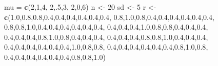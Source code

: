 \documentclass[]{book}
\newenvironment{Shaded}{\begin{snugshade}}{\end{snugshade}}
\newcommand{\DecValTok}[1]{\textcolor[rgb]{0.00,0.00,0.81}{#1}}
\newcommand{\FloatTok}[1]{\textcolor[rgb]{0.00,0.00,0.81}{#1}}
\newcommand{\KeywordTok}[1]{\textcolor[rgb]{0.13,0.29,0.53}{\textbf{#1}}}
\newcommand{\NormalTok}[1]{#1}
\newcommand{\StringTok}[1]{\textcolor[rgb]{0.31,0.60,0.02}{#1}}
\begin{document}
\begin{Shaded}
\begin{Highlighting}[]
\NormalTok{mu =}\StringTok{ }\KeywordTok{c}\NormalTok{(}\DecValTok{2}\NormalTok{,}\DecValTok{1}\NormalTok{,}\DecValTok{4}\NormalTok{,}
       \DecValTok{2}\NormalTok{,.}\DecValTok{5}\NormalTok{,}\DecValTok{3}\NormalTok{,}
       \DecValTok{2}\NormalTok{,}\DecValTok{0}\NormalTok{,}\DecValTok{6}\NormalTok{) }
\NormalTok{n <-}\StringTok{ }\DecValTok{20}
\NormalTok{sd <-}\StringTok{ }\DecValTok{5}
\NormalTok{r <-}\StringTok{ }\KeywordTok{c}\NormalTok{(}\FloatTok{1.0}\NormalTok{,}\FloatTok{0.8}\NormalTok{,}\FloatTok{0.8}\NormalTok{,}\FloatTok{0.4}\NormalTok{,}\FloatTok{0.4}\NormalTok{,}\FloatTok{0.4}\NormalTok{,}\FloatTok{0.4}\NormalTok{,}\FloatTok{0.4}\NormalTok{,}\FloatTok{0.4}\NormalTok{,}
       \FloatTok{0.8}\NormalTok{,}\FloatTok{1.0}\NormalTok{,}\FloatTok{0.8}\NormalTok{,}\FloatTok{0.4}\NormalTok{,}\FloatTok{0.4}\NormalTok{,}\FloatTok{0.4}\NormalTok{,}\FloatTok{0.4}\NormalTok{,}\FloatTok{0.4}\NormalTok{,}\FloatTok{0.4}\NormalTok{,}
       \FloatTok{0.8}\NormalTok{,}\FloatTok{0.8}\NormalTok{,}\FloatTok{1.0}\NormalTok{,}\FloatTok{0.4}\NormalTok{,}\FloatTok{0.4}\NormalTok{,}\FloatTok{0.4}\NormalTok{,}\FloatTok{0.4}\NormalTok{,}\FloatTok{0.4}\NormalTok{,}\FloatTok{0.4}\NormalTok{,}
       \FloatTok{0.4}\NormalTok{,}\FloatTok{0.4}\NormalTok{,}\FloatTok{0.4}\NormalTok{,}\FloatTok{1.0}\NormalTok{,}\FloatTok{0.8}\NormalTok{,}\FloatTok{0.8}\NormalTok{,}\FloatTok{0.4}\NormalTok{,}\FloatTok{0.4}\NormalTok{,}\FloatTok{0.4}\NormalTok{,}
       \FloatTok{0.4}\NormalTok{,}\FloatTok{0.4}\NormalTok{,}\FloatTok{0.4}\NormalTok{,}\FloatTok{0.8}\NormalTok{,}\FloatTok{1.0}\NormalTok{,}\FloatTok{0.8}\NormalTok{,}\FloatTok{0.4}\NormalTok{,}\FloatTok{0.4}\NormalTok{,}\FloatTok{0.4}\NormalTok{,}
       \FloatTok{0.4}\NormalTok{,}\FloatTok{0.4}\NormalTok{,}\FloatTok{0.4}\NormalTok{,}\FloatTok{0.8}\NormalTok{,}\FloatTok{0.8}\NormalTok{,}\FloatTok{1.0}\NormalTok{,}\FloatTok{0.4}\NormalTok{,}\FloatTok{0.4}\NormalTok{,}\FloatTok{0.4}\NormalTok{,}
       \FloatTok{0.4}\NormalTok{,}\FloatTok{0.4}\NormalTok{,}\FloatTok{0.4}\NormalTok{,}\FloatTok{0.4}\NormalTok{,}\FloatTok{0.4}\NormalTok{,}\FloatTok{0.4}\NormalTok{,}\FloatTok{1.0}\NormalTok{,}\FloatTok{0.8}\NormalTok{,}\FloatTok{0.8}\NormalTok{,}
       \FloatTok{0.4}\NormalTok{,}\FloatTok{0.4}\NormalTok{,}\FloatTok{0.4}\NormalTok{,}\FloatTok{0.4}\NormalTok{,}\FloatTok{0.4}\NormalTok{,}\FloatTok{0.4}\NormalTok{,}\FloatTok{0.8}\NormalTok{,}\FloatTok{1.0}\NormalTok{,}\FloatTok{0.8}\NormalTok{,}
       \FloatTok{0.4}\NormalTok{,}\FloatTok{0.4}\NormalTok{,}\FloatTok{0.4}\NormalTok{,}\FloatTok{0.4}\NormalTok{,}\FloatTok{0.4}\NormalTok{,}\FloatTok{0.4}\NormalTok{,}\FloatTok{0.8}\NormalTok{,}\FloatTok{0.8}\NormalTok{,}\FloatTok{1.0}\NormalTok{)}



\end{Highlighting}
\end{Shaded}
\end{document}
